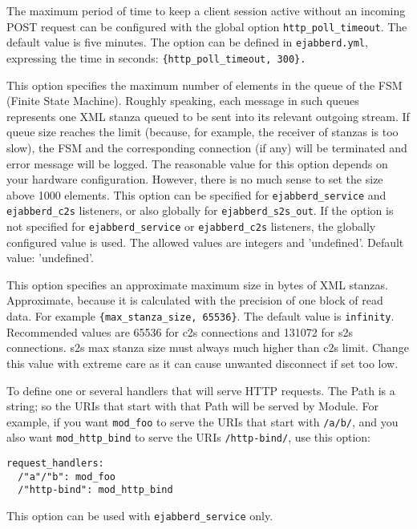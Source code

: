\documentclass[a4paper,10pt]{book}
\newcommand{\ind}[1]{\begin{latexonly}\index{#1}\end{latexonly}}
\newcommand{\bracehack}{\def\{{\char"7B}\def\}{\char"7D}}
\newcommand{\titem}[1]{\item[\bracehack\texttt{#1}]}
\newcommand{\term}[1]{\texttt{#1}}
\begin{document}
\begin{description}
    The maximum period of time to keep a client session active without
    an incoming POST request can be configured with the global option
    \term{http\_poll\_timeout}. The default value is five minutes.
    The option can be defined in \term{ejabberd.yml}, expressing the time
    in seconds: \verb|{http_poll_timeout, 300}.|
  \titem{max\_fsm\_queue: Size}
    This option specifies the maximum number of elements in the queue of the FSM
    (Finite State Machine).
    Roughly speaking, each message in such queues represents one XML
    stanza queued to be sent into its relevant outgoing stream. If queue size
    reaches the limit (because, for example, the receiver of stanzas is too slow),
    the FSM and the corresponding connection (if any) will be terminated
    and error message will be logged.
    The reasonable value for this option depends on your hardware configuration.
    However, there is no much sense to set the size above 1000 elements.
    This option can be specified for \term{ejabberd\_service} and
    \term{ejabberd\_c2s} listeners,
    or also globally for \term{ejabberd\_s2s\_out}.
    If the option is not specified for \term{ejabberd\_service} or
    \term{ejabberd\_c2s} listeners,
    the globally configured value is used.
    The allowed values are integers and 'undefined'.
    Default value: 'undefined'.
  \titem{max\_stanza\_size: Size}
    \ind{options!max\_stanza\_size}This option specifies an
    approximate maximum size in bytes of XML stanzas.  Approximate,
    because it is calculated with the precision of one block of read
    data. For example \verb|{max_stanza_size, 65536}|.  The default
    value is \term{infinity}. Recommended values are 65536 for c2s
    connections and 131072 for s2s connections. s2s max stanza size
    must always much higher than c2s limit. Change this value with
    extreme care as it can cause unwanted disconnect if set too low.
  \titem{request\_handlers: \{Path: Module\}} To define one or several handlers that will serve HTTP requests.
    The Path is a string; so the URIs that start with that Path will be served by Module.
    For example, if you want \term{mod\_foo} to serve the URIs that start with \term{/a/b/},
    and you also want \term{mod\_http\_bind} to serve the URIs \term{/http-bind/},
    use this option:
\begin{verbatim}
request_handlers:
  /"a"/"b": mod_foo
  /"http-bind": mod_http_bind
\end{verbatim}
  \titem{service\_check\_from: true|false}
    \ind{options!service\_check\_from}
    This option can be used with \term{ejabberd\_service} only.

\end{description}
\end{document}
